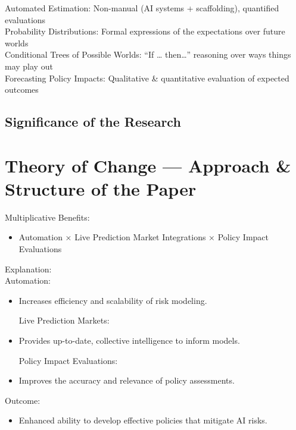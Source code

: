\documentclass[
  letterpaper,
]{book}
\providecommand{\tightlist}{%
  \setlength{\itemsep}{0pt}\setlength{\parskip}{0pt}}
\begin{document}
Automated Estimation: Non-manual (AI systems + scaffolding), quantified
evaluations\\
Probability Distributions: Formal expressions of the expectations over
future worlds\\
Conditional Trees of Possible Worlds: ``If \ldots{} then\ldots{}''
reasoning over ways things may play out\\
Forecasting Policy Impacts: Qualitative \& quantitative evaluation of
expected outcomes

\subsection{Significance of the
Research}\label{significance-of-the-research}

\subsection{}\label{section}

\section{Theory of Change --- Approach \& Structure of the
Paper}\label{theory-of-change-approach-structure-of-the-paper}

Multiplicative Benefits:

\begin{itemize}
\tightlist
\item
  Automation × Live Prediction Market Integrations × Policy Impact
  Evaluations
\end{itemize}

Explanation:\\
Automation:

\begin{itemize}
\item
  Increases efficiency and scalability of risk modeling.

  Live Prediction Markets:
\item
  Provides up-to-date, collective intelligence to inform models.

  Policy Impact Evaluations:
\item
  Improves the accuracy and relevance of policy assessments.
\end{itemize}

Outcome:

\begin{itemize}
\tightlist
\item
  Enhanced ability to develop effective policies that mitigate AI risks.
\end{itemize}
\end{document}
